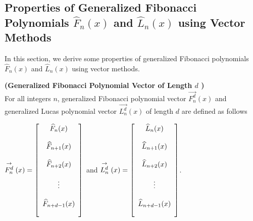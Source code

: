 \subsection{Properties of Generalized Fibonacci Polynomials $\widehat{F}_{ n}(x)$ and $\widehat{L}_{n}(x)$ using Vector Methods}
In this section, we derive some properties of generalized Fibonacci polynomials  $\widehat{F}_{ n}(x)$ and $\widehat{L}_{n}(x)$ using vector methods.
 \begin{definition}{\textbf{(Generalized Fibonacci Polynomial Vector of Length $d$ )}}\\
 For all integers $n$, generalized Fibonacci polynomial vector $\stackrel{\rightarrow}{F_{n}^d}(x)$ and generalized Lucas polynomial  vector $\stackrel{\rightarrow}{L_{n}^d}(x)$ of length $d$ are defined as follows
 
 \begin{center}
   $ \stackrel{\rightarrow}{F_{n}^d}(x) = 
 \left[\begin{array}{c}
           \bigskip 
           \widehat{F}_{n}(x)\\
            \bigskip 
	 	   \widehat{F}_{n+1}(x)\\
	 	    \bigskip 
	       \widehat{F}_{n+2}(x)\\
	        \bigskip 
	       \vdots\\
	        \bigskip 
	   \widehat{F}_{n+d-1}(x)
\end{array}
\right]$ and $ \stackrel{\rightarrow}{L_{n}^d}(x) = 
 \left[\begin{array}{c}
           \bigskip 
           \widehat{L}_{n}(x)\\
            \bigskip 
	 	  \widehat{L}_{n+1}(x)\\
	 	    \bigskip 
	    \widehat{L}_{n+2}(x)\\
	        \bigskip 
	       \vdots\\
	        \bigskip 
	       \widehat{L}_{n+d-1}(x)
\end{array}
\right]$.
 \end{center}
 \end{definition}
